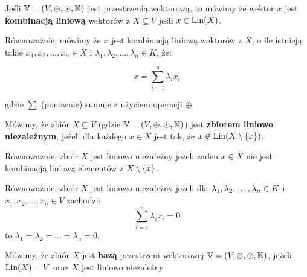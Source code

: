 \begin{definition}
Jeśli \( \mathbb{V} = (V, \oplus, \odot, \mathbb{K})\) jest przestrzenią wektorową, to mówimy że wektor \(x\) jest \textbf{kombinacją liniową} wektorów z \(X \subseteq V\) jeśli \(x \in {\mathrm{Lin}}(X)\). 

Równoważnie, mówimy że \(x\) jest kombinacją liniową wektorów z \(X\), o ile istnieją takie \(x_1, x_2, \dots, x_n \in X\) i \(\lambda_1, \lambda_2, \dots, \lambda_n \in K\), że:

\[
    x = \sum_{i=1}^{n} \lambda_i x_i 
\]

gdzie \(\sum\) (ponownie) sumuje z użyciem operacji \(\oplus\).
\end{definition}

\begin{definition}
\label{linear-dependence}
Mówimy, że zbiór \(X \subseteq V\) (gdzie \( \mathbb{V} = (V, \oplus, \odot, \mathbb{K}) \)) jest \textbf{zbiorem liniowo niezależnym}, jeżeli dla każdego \(x \in X\) jest tak, że \(x \not\in \lin(X \setminus \set{x})\).

Równoważnie, zbiór \(X\) jest liniowo niezależny jeżeli żaden \(x \in X\) nie jest kombinacją liniową elementów z \(X \setminus\set{x}\).

Równoważnie, zbiór \(X\) jest liniowo niezależny jeżeli dla \(\lambda_1, \lambda_2, \dots, \lambda_n \in K\) i \(x_1, x_2, \dots, x_n \in V\) zachodzi:
\[
    \sum_{i=1}^{n} \lambda_i x_i = 0
\]
to \(\lambda_1 = \lambda_2 = \dots = \lambda_n = 0\).
\end{definition}

\begin{definition}[Baza]
Mówimy, że zbiór \(X\) jest \textbf{bazą} przestrzeni wektorowej \( \mathbb{V} = (V, \oplus, \odot, \mathbb{K})\), jeżeli \({\mathrm{Lin}}(X) = V\) oraz \(X\) jest liniowo niezależny.
\end{definition}

